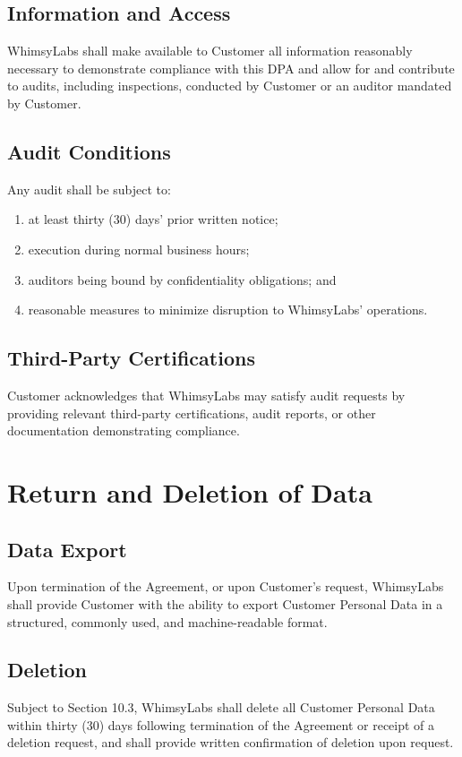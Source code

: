 \documentclass[11pt,a4paper]{article}
\begin{document}
\subsection{Information and Access}
WhimsyLabs shall make available to Customer all information reasonably necessary to demonstrate compliance with this DPA and allow for and contribute to audits, including inspections, conducted by Customer or an auditor mandated by Customer.

\subsection{Audit Conditions}
Any audit shall be subject to:
\begin{enumerate}[label=(\alph*)]
    \item at least thirty (30) days' prior written notice;
    \item execution during normal business hours;
    \item auditors being bound by confidentiality obligations; and
    \item reasonable measures to minimize disruption to WhimsyLabs' operations.
\end{enumerate}

\subsection{Third-Party Certifications}
Customer acknowledges that WhimsyLabs may satisfy audit requests by providing relevant third-party certifications, audit reports, or other documentation demonstrating compliance.

\section{Return and Deletion of Data}

\subsection{Data Export}
Upon termination of the Agreement, or upon Customer's request, WhimsyLabs shall provide Customer with the ability to export Customer Personal Data in a structured, commonly used, and machine-readable format.

\subsection{Deletion}
Subject to Section 10.3, WhimsyLabs shall delete all Customer Personal Data within thirty (30) days following termination of the Agreement or receipt of a deletion request, and shall provide written confirmation of deletion upon request.
\end{document}
